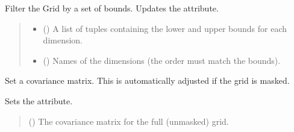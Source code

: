 \documentclass[letterpaper,10pt,english]{sphinxmanual}
\begin{document}
\begin{fulllineitems}
\begin{fulllineitems}
\label{\detokenize{grid:glomar_gridding.grid.Grid.select_bounds}}
\pysigstartsignatures
\pysiglinewithargsret
{}
{}
{}
\pysigstopsignatures
\sphinxAtStartPar
Filter the Grid by a set of bounds. Updates the  attribute.
\begin{quote}\begin{description}
\begin{itemize}
\item {}
\sphinxAtStartPar
{} () \textendash{} A list of tuples containing the lower and upper bounds for each
dimension.

\item {}
\sphinxAtStartPar
{} (\sphinxstyleliteralemphasis{\sphinxupquote{{[}}}\sphinxstyleliteralemphasis{\sphinxupquote{{]}}}) \textendash{} Names of the dimensions (the order must match the bounds).

\end{itemize}

\sphinxAtStartPar
{}

\end{description}\end{quote}

\end{fulllineitems}


\begin{fulllineitems}
\label{\detokenize{grid:glomar_gridding.grid.Grid.set_covariance}}
\pysigstartsignatures
\pysiglinewithargsret
{}
{}
{}
\pysigstopsignatures
\sphinxAtStartPar
Set a covariance matrix. This is automatically adjusted if the grid is
masked.

\sphinxAtStartPar
Sets the  attribute.
\begin{quote}\begin{description}
\sphinxAtStartPar
{} () \textendash{} The covariance matrix for the full (unmasked) grid.


\end{description}
\end{quote}
\end{fulllineitems}
\end{fulllineitems}
\end{document}
